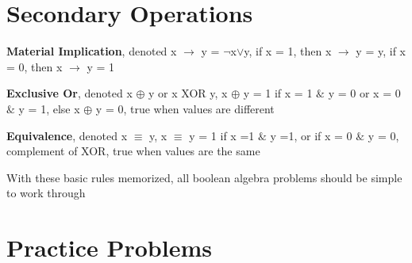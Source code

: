 \documentclass{article}
\begin{document}
\section{Secondary Operations}

\textbf{Material Implication}, denoted  x $\rightarrow$ y = $\neg$x$\lor$y, if x = 1, then x $\rightarrow$ y = y, if x = 0, then x $\rightarrow$ y = 1

\noindent
\textbf{Exclusive Or}, denoted x $\oplus$ y or x XOR y, x $\oplus$ y = 1 if x = 1 $\&$ y = 0 or x = 0 $\&$ y = 1, else x $\oplus$ y = 0, true when values are different

\noindent
\textbf{Equivalence}, denoted x $\equiv$ y, x $\equiv$ y = 1 if x =1 $\&$ y =1, or if x = 0 $\&$ y = 0, complement of XOR, true when values are the same
\bigskip

\noindent
With these basic rules memorized, all boolean algebra problems should be simple to work through

\section{Practice Problems}
\end{document}
